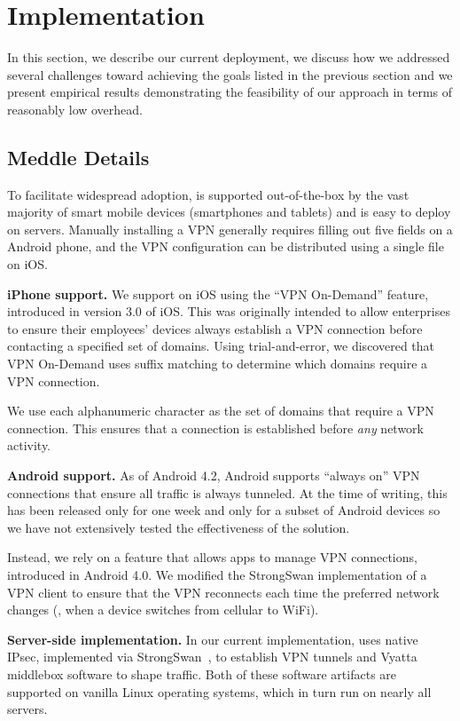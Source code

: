\section{Implementation}
In this section, we describe our current deployment, we discuss how we addressed several 
challenges toward achieving the goals listed in the previous section and 
we present empirical results demonstrating the feasibility of our approach 
in terms of reasonably low overhead. 

\subsection{Meddle Details}
To facilitate widespread adoption, \meddle is
supported out-of-the-box by the vast majority of smart mobile devices (smartphones and tablets) and 
is easy to deploy on servers. Manually installing a VPN generally requires filling out five
fields on a Android phone, and the VPN configuration can be
distributed using a single file on iOS. 




\noindent\textbf{iPhone support.} We support \meddle on iOS using the ``VPN On-Demand'' feature, 
introduced in version 3.0 of iOS. This was originally intended to allow enterprises to 
ensure their employees' devices always establish a VPN connection before contacting 
a specified set of domains. Using trial-and-error, we discovered that VPN On-Demand uses 
suffix matching to determine which domains require a VPN connection. 

We use each alphanumeric character as the set of domains that require a VPN 
connection. This ensures that a connection is established before \emph{any} network 
activity.

\noindent\textbf{Android support.} As of Android 4.2, Android supports 
``always on'' VPN connections that ensure all traffic is always tunneled. 
At the time of writing, this has been released only for one week and only 
for a subset of Android devices so we have not extensively tested the 
effectiveness of the solution. 

Instead, we rely on a feature that allows apps to manage VPN connections, 
introduced in Android 4.0. We modified the StrongSwan implementation of 
a VPN client to ensure that the VPN reconnects each time the preferred 
network changes (\eg, when a device switches from cellular to WiFi). 

\noindent\textbf{Server-side implementation.} In our current implementation, \meddle 
uses native IPsec, implemented via StrongSwan~\cite{strongswan}, to establish VPN tunnels 
and Vyatta middlebox software  to shape
traffic. Both of these software artifacts are supported on vanilla
Linux operating systems, which in turn run on nearly all servers. 
   
